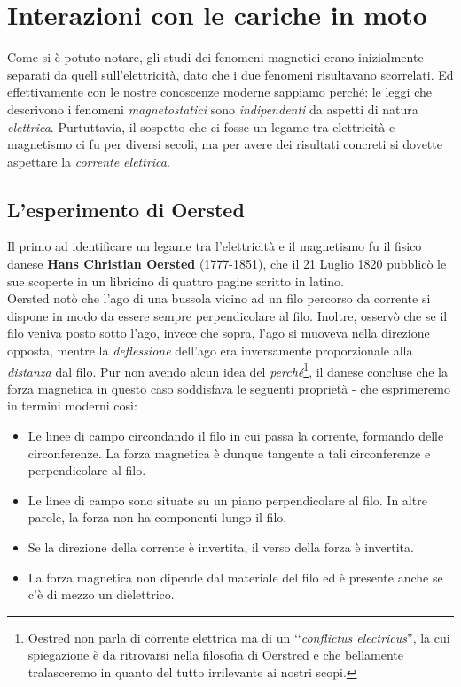 \section{Interazioni con le cariche in moto}
Come si è potuto notare, gli studi dei fenomeni magnetici erano inizialmente separati da quell sull'elettricità, dato che i due fenomeni risultavano scorrelati. Ed effettivamente con le nostre conoscenze moderne sappiamo perché: le leggi che descrivono i fenomeni \textit{magnetostatici} sono \textit{indipendenti} da aspetti di natura \textit{elettrica}. Purtuttavia, il sospetto che ci fosse un legame tra elettricità e magnetismo ci fu per diversi secoli, ma per avere dei risultati concreti si dovette aspettare la \textit{corrente elettrica}.
\subsection{L'esperimento di Oersted}
Il primo ad identificare un legame tra l'elettricità e il magnetismo fu il fisico danese \textbf{Hans Christian Oersted} (1777-1851), che il 21 Luglio 1820 pubblicò le sue scoperte in un libricino di quattro pagine scritto in latino.\\
Oersted notò che l'ago di una bussola vicino ad un filo percorso da corrente si dispone in modo da essere sempre perpendicolare al filo. Inoltre, osservò che se il filo veniva posto sotto l'ago, invece che sopra, l'ago si muoveva nella direzione opposta, mentre la \textit{deflessione} dell'ago era inversamente proporzionale alla \textit{distanza} dal filo.
Pur non avendo alcun idea del \textit{perché}\footnote{Oestred non parla di corrente elettrica ma di un ‘‘\textit{conflictus electricus}'', la cui spiegazione è da ritrovarsi nella filosofia di Oerstred e che bellamente tralasceremo in quanto del tutto irrilevante ai nostri scopi.}, il danese concluse che la forza magnetica in questo caso soddisfava le seguenti proprietà - che esprimeremo in termini moderni così: %
\begin{itemize}
	\item Le linee di campo circondando il filo in cui passa la corrente, formando delle circonferenze. La forza magnetica è dunque tangente a tali circonferenze e perpendicolare al filo.
	\item Le linee di campo sono situate su un piano perpendicolare al filo. In altre parole, la forza non ha componenti lungo il filo,
	\item Se la direzione della corrente è invertita, il verso della forza è invertita.
	\item La forza magnetica non dipende dal materiale del filo ed è presente anche se c'è di mezzo un dielettrico.
\end{itemize} 
